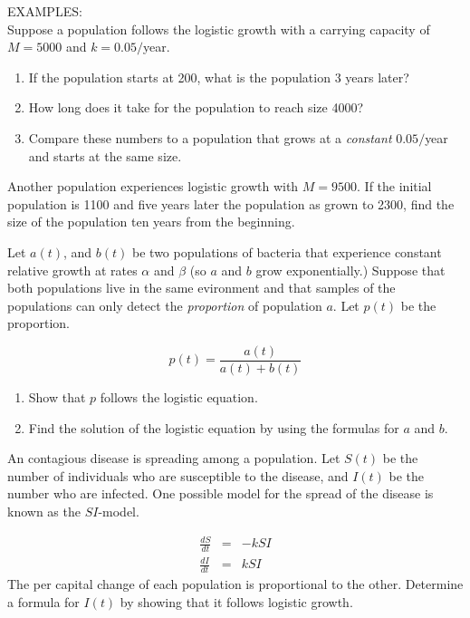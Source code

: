 \documentclass[11pt]{article}
\begin{document}
\vspace{1in.}
\pagebreak

EXAMPLES:\\

Suppose a population follows the logistic growth with a carrying capacity of $M=5000$ and $k=0.05/$year.
\begin{enumerate}
	\item {If the population starts at 200, what is the population 3 years later?}
	\item{How long does it take for the population to reach size 4000?}
	\item{Compare these numbers to a population that grows at a \emph{constant} $0.05 /$year and starts at the same size.}
\end{enumerate}

\vspace{5in}
Another population experiences logistic growth with $M=9500$.  If the initial population is 1100 and five years later the population as grown to 2300, find the size of the population ten years from the beginning.


\pagebreak

Let $a(t)$, and $b(t)$ be two populations of bacteria that experience constant relative growth at rates $\alpha$ and $\beta$ (so $a$ and $b$ grow exponentially.)  Suppose that both populations live in the same evironment and that samples of the populations can only detect the \emph{proportion} of population $a$.  Let $p(t)$ be the proportion.

\begin{displaymath}
p(t)= \frac{a(t)}{a(t) + b(t)}
\end{displaymath}
\begin{enumerate}
	\item Show that $p$ follows the logistic equation.
	\item Find the solution of the logistic equation by using the formulas for $a$  and $b$.
	
\end{enumerate}



\pagebreak

An contagious disease is spreading among a population.  Let $S(t)$ be the number of individuals who are susceptible to the disease, and $I(t)$ be the number who are infected.  One possible model for the spread of the disease is known as the $SI$-model.

\begin{eqnarray*}
\frac{dS}{dt} & = & -kSI \\
\frac{dI}{dt} & = & kSI
\end{eqnarray*}
The per capital change of each population is proportional to the other.  Determine a formula for $I(t)$ by showing that it follows logistic growth.
\end{document}
